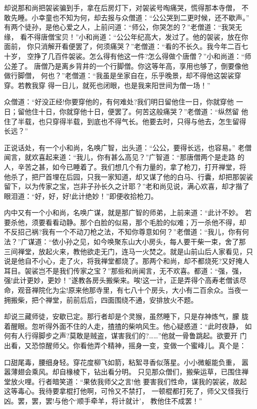 却说那和尚把袈裟骗到手，拿在后房灯下，对袈裟号啕痛哭，慌得那本寺僧，
不敢先睡。小幸童也不知为何，却去报与众僧道：“公公哭到二更时候，还不歇声。”
有两个徒孙，是他心爱之人，上前问道：“师公，你哭怎的？”老僧道：“我哭无缘，
看不得唐僧宝贝！”小和尚道：“公公年纪高大，发过了。他的袈裟，放在你面前，
你只消解开看便罢了，何须痛哭？”老僧道：“看的不长久。我今年二百七十岁，
空挣了几百件袈裟。怎么得有他这一件?怎么得做个唐僧？”小和尚道：“师公差了。
唐僧乃是离乡背井的一个行脚僧。你这等年高，享用也够了，倒要像他做行脚僧，
何也？”老僧道：“我虽是坐家自在，乐乎晚景，却不得他这袈裟穿穿。若教我穿
得一日儿，就死也闭眼，也是我来阳世间为僧一场！”

众僧道：“好没正经!你要穿他的，有何难处?我们明日留他住一日，你就穿他
一日；留他住十日，你就穿他十日，便罢了。何苦这般痛哭？”老僧道：“纵然留
他住了半载，也只穿得半载，到底也不得气长。他要去时，只得与他去，怎生留得
长远？”

正说话处，有一个小和尚，名唤广智，出头道：“公公，要得长远，也容易。”
老僧闻言，就欢喜起来道：“我儿，你有甚么高见？”广智道：“那唐僧两个是走路
的人，辛苦之甚，如今已睡着了。我们想几个有力量的，拿了枪刀，打开禅堂，将
他杀了，把尸首埋在后园，只我一家知道，却又谋了他的白马、行囊，却把那袈裟
留下，以为传家之宝，岂非子孙长久之计耶？”老和尚见说，满心欢喜，却才揩了
眼泪道：“好，好，好!此计绝妙！”即便收拾枪刀。

内中又有一个小和尚，名唤广谋，就是那广智的师弟，上前来道：“此计不妙。
若要杀他，须要看看动静。那个白脸的似易，那个毛脸的似难；万一杀他不得，却
不反招己祸?我有一个不动刀枪之法，不知你尊意如何？”老僧道：“我儿，你有何
法？”广谋道：“依小孙之见，如今唤聚东山大小房头，每人要干柴一束，舍了那
三间禅堂，放起火来，教他欲走无门，连马一火焚之。就是山前山后人家看见，只
说是他自不小心，走了火，将我禅堂都烧了。那两个和尚，却不都烧死?又好掩人
耳目。袈裟岂不是我们传家之宝？”那些和尚闻言，无不欢喜。都道：“强，强，
强!此计更妙，更妙！”遂教各房头搬柴来。唉!这一计，正是弄得个高寿老僧该尽
命，观音禅院化为尘!原来他那寺里，有七八十个房头，大小有二百余众。当夜一
拥搬柴，把个禅堂，前前后后，四面围绕不通，安排放火不题。

却说三藏师徒，安歇已定。那行者却是个灵猴，虽然睡下，只是存神炼气，朦
胧着醒眼。忽听得外面不住的人走，揸揸的柴响风生。他心疑惑道：“此时夜静，
如何有人行得脚步之声?莫敢是贼盗，谋害我们的?……”他就一骨鲁跳起。欲要开
门出看，又恐惊醒师父。你看他弄个精神，摇身一变，变做一个蜜峰儿。真个是：

口甜尾毒，腰细身轻。穿花度柳飞如箭，粘絮寻香似落星。小小微躯能负重，
嚣嚣薄翅会乘风。却自椽棱下，钻出看分明。
只见那众僧们，搬柴运草，已围住禅堂放火哩。行者暗笑道：“果依我师父之言!他
要害我们性命，谋我的袈裟，故起这等毒心。我待要拿棍打他啊，可怜又不禁打，
一顿棍都打死了，师父又怪我行凶。罢，罢，罢!与他个‘顺手牵羊，将计就计’，
教他住不成罢！”

